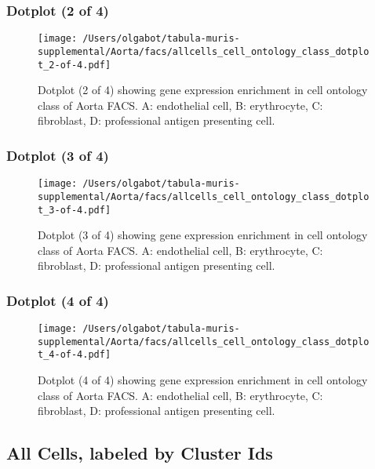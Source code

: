 \clearpage
\clearpage
\subsubsection{Dotplot (2 of 4)}
\begin{figure}[h]
\centering
\texttt{[image: /Users/olgabot/tabula-muris-supplemental/Aorta/facs/allcells\_cell\_ontology\_class\_dotplot\_2-of-4.pdf]}

\caption{ Dotplot (2 of 4)  showing gene expression enrichment in cell ontology class of Aorta FACS. A: endothelial cell, B: erythrocyte, C: fibroblast, D: professional antigen presenting cell.}
\end{figure}


\clearpage
\clearpage
\subsubsection{Dotplot (3 of 4)}
\begin{figure}[h]
\centering
\texttt{[image: /Users/olgabot/tabula-muris-supplemental/Aorta/facs/allcells\_cell\_ontology\_class\_dotplot\_3-of-4.pdf]}

\caption{ Dotplot (3 of 4)  showing gene expression enrichment in cell ontology class of Aorta FACS. A: endothelial cell, B: erythrocyte, C: fibroblast, D: professional antigen presenting cell.}
\end{figure}


\clearpage
\clearpage
\subsubsection{Dotplot (4 of 4)}
\begin{figure}[h]
\centering
\texttt{[image: /Users/olgabot/tabula-muris-supplemental/Aorta/facs/allcells\_cell\_ontology\_class\_dotplot\_4-of-4.pdf]}

\caption{ Dotplot (4 of 4)  showing gene expression enrichment in cell ontology class of Aorta FACS. A: endothelial cell, B: erythrocyte, C: fibroblast, D: professional antigen presenting cell.}
\end{figure}


\clearpage
\subsection{All Cells, labeled by Cluster Ids}
